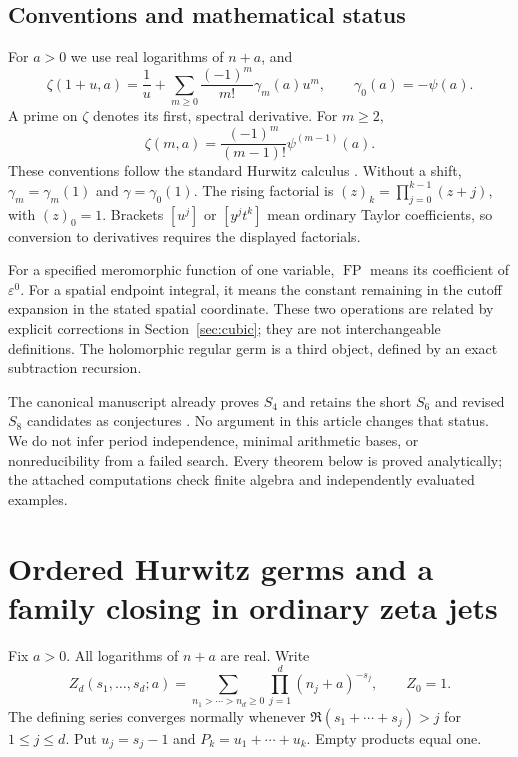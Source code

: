 \documentclass[11pt,letterpaper]{article}
\numberwithin{equation}{section}
\theoremstyle{definition}
\theoremstyle{remark}
\DeclareMathOperator{\FP}{FP}
\newcommand{\eps}{\varepsilon}
\begin{document}
\subsection{Conventions and mathematical status}

For $a>0$ we use real logarithms of $n+a$, and
\begin{equation}\label{scope:stieltjes}
 \zeta(1+u,a)=\frac1u+
  \sum_{m\ge0}\frac{(-1)^m}{m!}\gamma_m(a)u^m,
 \qquad \gamma_0(a)=-\psi(a).
\end{equation}
A prime on $\zeta$ denotes its first, spectral derivative. For $m\ge2$,
\begin{equation}\label{scope:polygamma}
 \zeta(m,a)=\frac{(-1)^m}{(m-1)!}\psi^{(m-1)}(a).
\end{equation}
These conventions follow the standard Hurwitz calculus \cite{DLMFHurwitz}.
Without a shift, $\gamma_m=\gamma_m(1)$ and $\gamma=\gamma_0(1)$.
The rising factorial is $(z)_k=\prod_{j=0}^{k-1}(z+j)$, with
$(z)_0=1$.
Brackets $[u^j]$ or $[y^jt^k]$ mean ordinary Taylor coefficients,
so conversion to derivatives requires the displayed factorials.

For a specified meromorphic function of one variable, $\FP$ means its
coefficient of $\eps^0$. For a spatial endpoint integral, it means
the constant remaining in the cutoff expansion in the stated spatial
coordinate. These two operations are related by explicit corrections
in Section~\ref{sec:cubic}; they are not interchangeable definitions.
The holomorphic regular germ is a third object, defined by an exact
subtraction recursion.

The canonical manuscript already proves $S_4$ and retains the short
$S_6$ and revised $S_8$ candidates as conjectures \cite{repomain}.
No argument in this article changes that status. We do not infer
period independence, minimal arithmetic bases, or nonreducibility
from a failed search. Every theorem below is proved analytically;
the attached computations check finite algebra and independently
evaluated examples.



\section{Ordered Hurwitz germs and a family closing in ordinary zeta jets}

Fix $a>0$. All logarithms of $n+a$ are real. Write
\[
 Z_d(s_1,\ldots,s_d;a)
 =\sum_{n_1>\cdots>n_d\ge0}\prod_{j=1}^d(n_j+a)^{-s_j},
 \qquad Z_0=1.
\]
The defining series converges normally whenever
$\Re(s_1+\cdots+s_j)>j$ for $1\le j\le d$.
Put $u_j=s_j-1$ and $P_k=u_1+\cdots+u_k$.
Empty products equal one.
\end{document}

